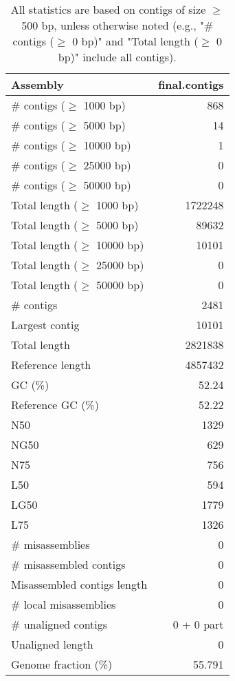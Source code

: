\documentclass[12pt,a4paper]{article}
\begin{document}
\begin{table}[ht]
\begin{center}
\caption{All statistics are based on contigs of size $\geq$ 500 bp, unless otherwise noted (e.g., "\# contigs ($\geq$ 0 bp)" and "Total length ($\geq$ 0 bp)" include all contigs).}
\begin{tabular}{|l*{1}{|r}|}
\hline
Assembly & final.contigs \\ \hline
\# contigs ($\geq$ 1000 bp) & 868 \\ \hline
\# contigs ($\geq$ 5000 bp) & 14 \\ \hline
\# contigs ($\geq$ 10000 bp) & 1 \\ \hline
\# contigs ($\geq$ 25000 bp) & 0 \\ \hline
\# contigs ($\geq$ 50000 bp) & 0 \\ \hline
Total length ($\geq$ 1000 bp) & 1722248 \\ \hline
Total length ($\geq$ 5000 bp) & 89632 \\ \hline
Total length ($\geq$ 10000 bp) & 10101 \\ \hline
Total length ($\geq$ 25000 bp) & 0 \\ \hline
Total length ($\geq$ 50000 bp) & 0 \\ \hline
\# contigs & 2481 \\ \hline
Largest contig & 10101 \\ \hline
Total length & 2821838 \\ \hline
Reference length & 4857432 \\ \hline
GC (\%) & 52.24 \\ \hline
Reference GC (\%) & 52.22 \\ \hline
N50 & 1329 \\ \hline
NG50 & 629 \\ \hline
N75 & 756 \\ \hline
L50 & 594 \\ \hline
LG50 & 1779 \\ \hline
L75 & 1326 \\ \hline
\# misassemblies & 0 \\ \hline
\# misassembled contigs & 0 \\ \hline
Misassembled contigs length & 0 \\ \hline
\# local misassemblies & 0 \\ \hline
\# unaligned contigs & 0 + 0 part \\ \hline
Unaligned length & 0 \\ \hline
Genome fraction (\%) & 55.791 \\ \hline

\end{tabular}
\end{center}
\end{table}
\end{document}
